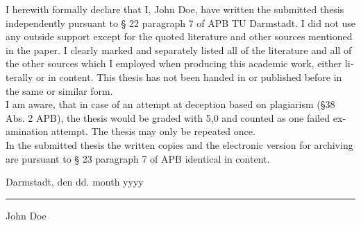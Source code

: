\documentclass[11pt,longdoc,accentcolor=tud1b,paper=a4]{tuddesign/tudreport}
\newcounter{dummy} %
\newcommand{\komName}{John Doe\xspace}
\newcommand{\komSubmissionDate}{dd. month yyyy\xspace}%
\begin{document}
\begin{otherlanguage}{ngerman}
{	\noindent I herewith formally declare that I, \komName, have written the submitted thesis independently pursuant to § 22 paragraph 7 of APB TU Darmstadt. 
	I did not use any outside support except for the quoted literature and other sources mentioned in the paper. 
	I clearly marked and separately listed all of the literature and all of the other sources which I employed when producing this academic work, either literally or in content.
	This thesis has not been handed in or published before in the same or similar form. \\

	\noindent I am aware, that in case of an attempt at deception based on plagiarism (§38 Abs. 2 APB), the thesis would be graded with 5,0 and counted as one failed examination attempt. 
	The thesis may only be repeated once. \\
	
    \noindent In the submitted thesis the written copies and the electronic version for archiving are pursuant to § 23 paragraph 7 of APB identical in content.
    
	}{}	
    \vspace{4em}
    
    \noindent Darmstadt, den \komSubmissionDate 
    
    \vspace{3em}
    
    \noindent\rule{5cm}{0.4pt}
    
    \noindent\komName
    
    \end{otherlanguage}
   
	\tableofcontents
	
	\cleardoublepage

	
	
	
	
	
\end{document}
